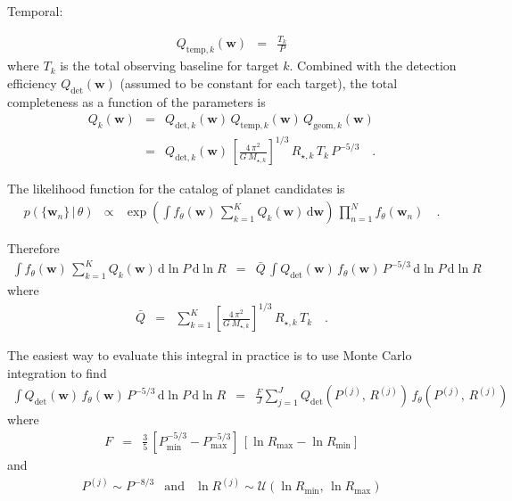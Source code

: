 \documentclass[preprint]{aastex}
\newcommand{\dd}{\ensuremath{\,\mathrm{d}}}
\newcommand{\bvec}[1]{{\ensuremath{\boldsymbol{#1}}}}
\newcommand{\params}{{\ensuremath{\bvec{w}}}}
\newcommand{\poppars}{{\ensuremath{\theta}}}
\begin{document}
Temporal:

\begin{eqnarray}
Q_{\mathrm{temp},k} (\params) &=& \frac{T_k}{P}
\end{eqnarray}
where $T_k$ is the total observing baseline for target $k$.
Combined with the detection efficiency $Q_{\mathrm{det}}(\params)$ (assumed to
be constant for each target), the total completeness as a function of the
parameters is
\begin{eqnarray}
Q_k(\params) &=& Q_{\mathrm{det},k}(\params) \,
                 Q_{\mathrm{temp},k} (\params) \,
                 Q_{\mathrm{geom},k} (\params) \\
&=& Q_{\mathrm{det},k}(\params) \,
    \left[\frac{4\,\pi^2}{G\,M_{\star,k}}\right]^{1/3}\,
    R_{\star,k}\,T_k\,P^{-5/3} \quad.
\end{eqnarray}

The likelihood function for the catalog of planet candidates is
\begin{eqnarray}
p(\{\params_n\}\,|\,\poppars) &\propto&
    \exp \left(
        \int f_\poppars (\params)\,\sum_{k=1}^K Q_k(\params) \dd\params
    \right) \, \prod_{n=1}^N f_\poppars (\params_n) \quad.
\end{eqnarray}

Therefore
\begin{eqnarray}
\int f_\poppars (\params)\,\sum_{k=1}^K Q_k(\params) \dd\ln P\dd\ln R &=&
    \bar{Q}\,\int Q_{\mathrm{det}}(\params)\,f_\poppars(\params)\,P^{-5/3}
        \dd\ln P\dd\ln R
\end{eqnarray}
where
\begin{eqnarray}
\bar{Q} &=& \sum_{k=1}^K
    \left[\frac{4\,\pi^2}{G\,M_{\star,k}}\right]^{1/3}\,R_{\star,k}\,T_k
\quad.
\end{eqnarray}

The easiest way to evaluate this integral in practice is to use Monte Carlo
integration to find
\begin{eqnarray}
\int Q_{\mathrm{det}}(\params)\,f_\poppars(\params)\,P^{-5/3}\dd\ln P\dd\ln R
&=& \frac{F}{J}\sum_{j=1}^J Q_{\mathrm{det}}(P^{(j)},\,R^{(j)})\,
        f_\poppars(P^{(j)},\,R^{(j)})
\end{eqnarray}
where
\begin{eqnarray}
F &=& \frac{3}{5}\,[P_\mathrm{min}^{-5/3}-P_\mathrm{max}^{-5/3}]\,
      [\ln R_\mathrm{max} - \ln R_\mathrm{min}]
\end{eqnarray}
and
\begin{eqnarray}
P^{(j)} \sim P^{-8/3} &\mathrm{and}&
\ln R^{(j)} \sim \mathcal{U}(\ln R_\mathrm{min},\,\ln R_\mathrm{max})
\end{eqnarray}
\end{document}
